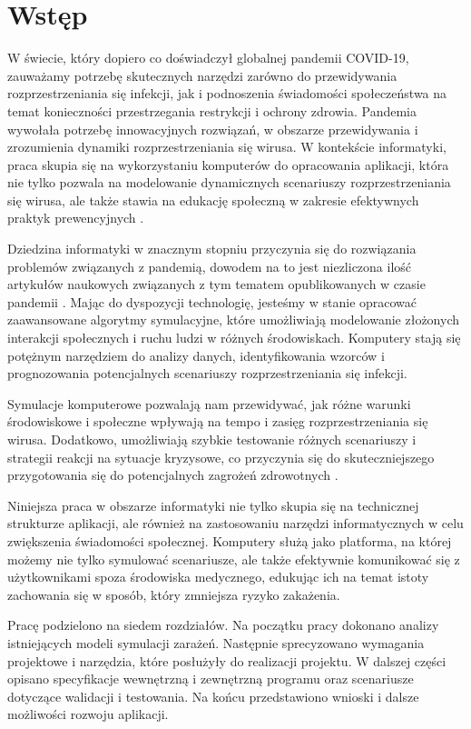 \chapter{Wstęp}
\label{ch:wstep}

W świecie, który dopiero co doświadczył globalnej pandemii COVID-19, zauważamy potrzebę skutecznych narzędzi zarówno do przewidywania rozprzestrzeniania się infekcji, jak i podnoszenia świadomości społeczeństwa na temat konieczności przestrzegania restrykcji i ochrony zdrowia. Pandemia wywołała potrzebę innowacyjnych rozwiązań, w obszarze przewidywania i zrozumienia dynamiki rozprzestrzeniania się wirusa. W kontekście informatyki, praca skupia się na wykorzystaniu komputerów do opracowania aplikacji, która nie tylko pozwala na modelowanie dynamicznych scenariuszy rozprzestrzeniania się wirusa, ale także stawia na edukację społeczną w zakresie efektywnych praktyk prewencyjnych \cite{bib:simulationforeducation}.

Dziedzina informatyki w znacznym stopniu przyczynia się do rozwiązania problemów związanych z pandemią, dowodem na to jest niezliczona ilość artykułów naukowych związanych z tym tematem opublikowanych w czasie pandemii \cite{bib:covid19}\cite{bib:covid191}\cite{bib:covid192}. Mając do dyspozycji technologię, jesteśmy w stanie opracować zaawansowane algorytmy symulacyjne, które umożliwiają modelowanie złożonych interakcji społecznych i ruchu ludzi w różnych środowiskach. Komputery stają się potężnym narzędziem do analizy danych, identyfikowania wzorców i prognozowania potencjalnych scenariuszy rozprzestrzeniania się infekcji.

Symulacje komputerowe pozwalają nam przewidywać, jak różne warunki środowiskowe i społeczne wpływają na tempo i zasięg rozprzestrzeniania się wirusa. Dodatkowo, umożliwiają szybkie testowanie różnych scenariuszy i strategii reakcji na sytuacje kryzysowe, co przyczynia się do skuteczniejszego przygotowania się do potencjalnych zagrożeń zdrowotnych \cite{bib:Brockmann2017Global}.

Niniejsza praca w obszarze informatyki nie tylko skupia się na technicznej strukturze aplikacji, ale również na zastosowaniu narzędzi informatycznych w celu zwiększenia świadomości społecznej. Komputery służą jako platforma, na której możemy nie tylko symulować scenariusze, ale także efektywnie komunikować się z użytkownikami spoza środowiska medycznego, edukując ich na temat istoty zachowania się w sposób, który zmniejsza ryzyko zakażenia.

Pracę podzielono na siedem rozdziałów. Na początku pracy dokonano analizy istniejących modeli symulacji zarażeń. Następnie sprecyzowano wymagania projektowe i narzędzia, które posłużyły do realizacji projektu. W dalszej części opisano specyfikacje wewnętrzną i zewnętrzną programu oraz scenariusze dotyczące walidacji i testowania. Na końcu  przedstawiono wnioski i dalsze możliwości rozwoju aplikacji.
